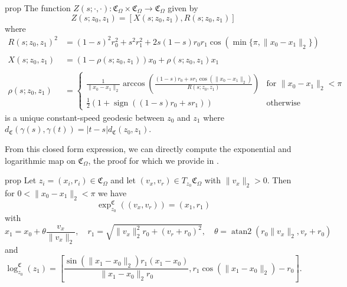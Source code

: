 \documentclass[11pt]{article}
\begin{document}
\begin{restatable}{prop}{}
    The function $Z(s; \cdot, \cdot ):\mathfrak{C}_\Omega \times \mathfrak{C}_\Omega \rightarrow \mathfrak{C}_\Omega$ given by 
    \begin{equation} \label{eq: cone geodesics}
        Z(s; z_0, z_1) = \left[X\left(s; z_0, z_1\right) , R\left(s; z_0, z_1\right)\right]
    \end{equation}
    where
    \begin{align*}
        R(s; z_0, z_1)^2 &= (1-s)^2r_0^2 + s^2r_1^2 + 2s(1-s)r_0r_1\cos(\min\{\pi, \|x_0 - x_1\|_2\}) \\
        \\[0.25ex]X(s; z_0, z_1) &= (1 - \rho(s; z_0, z_1))x_0 + \rho(s; z_0, z_1)x_1 \\
        \\[0.05ex]\rho(s; z_0, z_1) &= \begin{cases}
            \frac{1}{\|x_0 - x_1\|_2}\arccos\left(\frac{(1-s)r_0 + sr_1\cos(\|x_0 - x_1\|_2)}{R(s; z_0, z_1)}\right) & \text{for }\|x_0 - x_1\|_2 < \pi \\
            \frac{1}{2}\left(1 + \operatorname{sign}((1-s)r_0 + sr_1)\right) & \text{otherwise}
        \end{cases}
    \end{align*}
    is a unique constant-speed geodesic between $z_0$ and $z_1$ where $d_{\mathfrak{C}}(\gamma(s), \gamma(t)) = |t-s|d_{\mathfrak{C}}(z_0, z_1)$. 
\end{restatable}

From this closed form expression, we can directly compute the exponential and logarithmic map on $\mathfrak{C}_\Omega$, the proof for which we provide in .
\begin{restatable}{prop}{} \label{cone exponential and log map}
    Let $z_i = (x_i, r_i) \in \mathfrak{C}_{\Omega}$ and let $(v_x, v_r) \in T_{z_0}\mathfrak{C}_\Omega$ with $\|v_x\|_2 > 0$. Then for $0 < \|x_0 - x_1\|_2 < \pi$ we have
    \begin{equation} \label{eq: cone exp map}
        \exp^{\mathfrak{C}}_{z_0}((v_x, v_r)) = \left(x_1, r_1\right)
    \end{equation}
    with 
    \begin{equation*}
        x_1 = x_0 + \theta\frac{v_x}{\|v_x\|_2}, \quad r_1 = \sqrt{\|v_x\|_2^2r_0 + (v_r+r_0)^2}, \quad \theta = \operatorname{atan2}(r_0\|v_x\|_2, v_r + r_0)
    \end{equation*}
    and 
    \begin{equation} \label{eq: cone log map}
        \log_{z_0}^\mathfrak{C}(z_1) = \left[\frac{\sin(\|x_1 - x_0\|_2)r_1(x_1 - x_0)}{\|x_1 - x_0\|_2r_0}, r_1\cos(\|x_1 - x_0\|_2) - r_0\right].
    \end{equation}
\end{restatable} 
\end{document}
